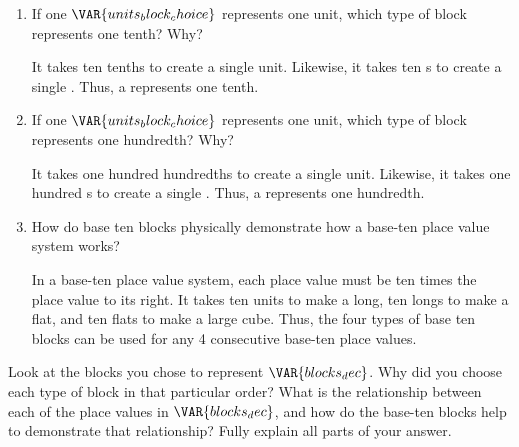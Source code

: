 \begin{enumerate}
    \item If one $\VAR{units_block_choice}$ represents one unit, which type of block represents one tenth? Why?

    \vspace{20pt}
    \begin{ansenv}
        It takes ten tenths to create a single unit. Likewise, it takes ten s to create a single . Thus, a  represents one tenth.
    \end{ansenv}
    \vfill

    \item If one $\VAR{units_block_choice}$ represents one unit, which type of block represents one hundredth? Why?

    \vspace{20pt}
    \begin{ansenv}
        It takes one hundred hundredths to create a single unit. Likewise, it takes one hundred s to create a single . Thus, a  represents one hundredth. 
    \end{ansenv}
    \vfill

    \item How do base ten blocks physically demonstrate how a base-ten place value system works?

    \vspace{20pt}
    \begin{ansenv}
        In a base-ten place value system, each place value must be ten times the place value to its right. It takes ten units to make a long, ten longs to make a flat, and ten flats to make a large cube. Thus, the four types of base ten blocks can be used for any 4 consecutive base-ten place values.
    \end{ansenv}
    \vfill

\end{enumerate}
            
    
            

Look at the blocks you chose to represent $\VAR{blocks_dec}$. Why did you choose each type of block in that particular order? What is the relationship between each of the place values in $\VAR{blocks_dec}$, and how do the base-ten blocks help to demonstrate that relationship? Fully explain all parts of your answer.